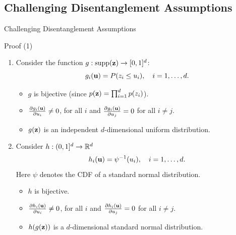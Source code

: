 \subsection{Challenging Disentanglement Assumptions}
\begin{frame}{Challenging Disentanglement Assumptions}
\begin{block}{Proof (1)}
	\begin{enumerate}
		\item 
		Consider the function $g: \text{supp}(\mathbf{z}) \rightarrow [0, 1]^d$:
		\vspace{-0.1cm}
		\[
		g_i(\mathbf{u}) = P(z_i \leq u_i), \quad i=1, \dots, d.
		\]
		\vspace{-0.4cm}
		\begin{itemize}
			\item $g$ is bijective (since $p(\mathbf{z}) = \prod_{i=1}^dp(z_i)$).
			\item $\frac{\partial g_i(\mathbf{u})}{\partial u_i} \neq 0$, for all $i$ and $\frac{\partial g_i(\mathbf{u})}{\partial u_j} = 0$ for all $i \neq j$.
			\item $g(\mathbf{z})$ is an independent $d$-dimensional uniform distribution.
		\end{itemize}
		\item 
		Consider $h: (0, 1]^d \rightarrow \mathbb{R}^d$
		\[
		h_i(\mathbf{u}) = \psi^{-1}(u_i), \quad i= 1, \dots, d.
		\]
		Here $\psi$  denotes the CDF of a standard normal distribution.
		\begin{itemize}
			\item $h$ is bijective.
			\item $\frac{\partial h_i(\mathbf{u})}{\partial u_i} \neq 0$, for all $i$ and $\frac{\partial h_i(\mathbf{u})}{\partial u_j} = 0$ for all $i \neq j$.
			\item $h(g(\mathbf{z}))$  is a $d$-dimensional standard normal distribution.
		\end{itemize}
	\end{enumerate}
\end{block}

\end{frame}
